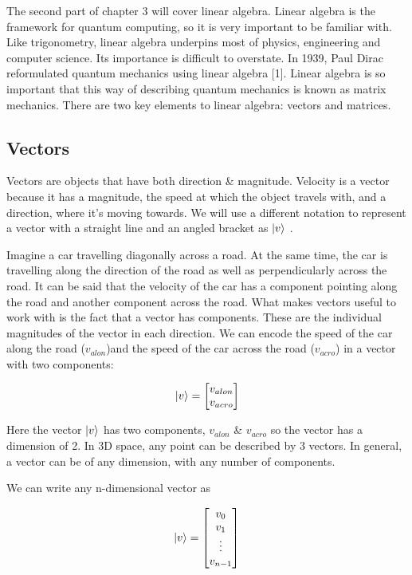 The second part of chapter 3 will cover linear algebra. Linear algebra is the framework for quantum computing, so it is very important to be familiar with. Like trigonometry, linear algebra underpins most of physics, engineering and computer science. Its importance is difficult to overstate. In 1939, Paul Dirac reformulated quantum mechanics using linear algebra [1]. Linear algebra is so important that this way of describing quantum mechanics is known as matrix mechanics. There are two key elements to linear algebra: vectors and matrices. 

\subsection{ Vectors}

Vectors are objects that have both direction \& magnitude. Velocity is a vector because it has a magnitude, the speed at which the object travels with, and a direction, where it's moving towards. We will use a different notation to represent a vector with a straight line and an angled bracket as $ \ket{v} $ .

Imagine a car travelling diagonally across a road. At the same time, the car is travelling along the direction of the road as well as perpendicularly across the road. It can be said that the velocity of the car has a component pointing along the road and another component across the road. What makes vectors useful to work with is the fact that a vector has components. These are the individual magnitudes of the vector in each direction. We can encode the speed of the car along the road ($v_{alon}$)and the speed of the car across the road ($v_{acro}$) in a vector with two components: 

$$
\ket{v} = \begin{bmatrix}v_{alon} \\ v_{acro}
\end{bmatrix}
$$

Here the vector $\ket{v}$ has two components, $v_{alon}$ \& $v_{acro}$ so the vector has a dimension of 2. In 3D space, any point can be described by 3 vectors. In general, a vector can be of any dimension, with any number of components. 

We can write any n-dimensional vector as

$$
\ket{v} = \begin{bmatrix} v_0 \\ v_1 \\ \vdots \\ v_{n-1} \end{bmatrix}
$$

